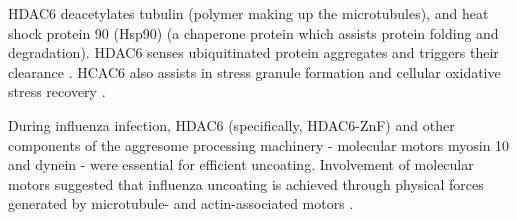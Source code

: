 HDAC6 deacetylates tubulin \cite{zhang2003hdac, zhang2008mice} (polymer making up the microtubules), and heat shock protein 90 (Hsp90) \cite{kovacs2005hdac6} (a chaperone protein which assists protein folding and degradation). HDAC6 senses ubiquitinated protein aggregates and triggers their clearance \cite{boyault2007hdac6}. HCAC6 also assists in stress granule formation and cellular oxidative stress recovery \cite{kwon2007deacetylase}.

During influenza infection, HDAC6 (specifically, HDAC6-ZnF) and other components of the aggresome processing machinery - molecular motors myosin 10 and dynein - were essential for efficient uncoating. Involvement of molecular motors suggested that influenza uncoating is achieved through physical forces generated by microtubule- and actin-associated motors \cite{banerjee2014influenza}.


